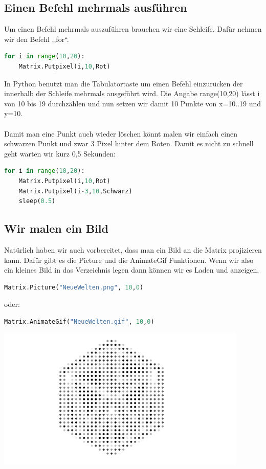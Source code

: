 \subsection{\large{Einen Befehl mehrmals ausführen}}
Um einen Befehl mehrmals auszuführen brauchen wir eine Schleife. Dafür nehmen wir den Befehl ,,for``.
\begin{lstlisting}[language=Python, caption=For Schleifen]
for i in range(10,20):
	Matrix.Putpixel(i,10,Rot)
\end{lstlisting}
In Python benutzt man die Tabulatortaste um einen Befehl einzurücken der innerhalb der Schleife mehrmals ausgeführt wird. Die Angabe range(10,20) lässt i von 10 bis 19 durchzählen und nun setzen wir damit 10 Punkte von x=10..19 und y=10. \\
\ \\
Damit man eine Punkt auch wieder löschen könnt malen wir einfach einen schwarzen Punkt und zwar 3 Pixel hinter dem Roten. Damit es nicht zu schnell geht warten wir kurz 0,5 Sekunden:
\begin{lstlisting}[language=Python, caption=For Schleifen]
for i in range(10,20):
	Matrix.Putpixel(i,10,Rot)
	Matrix.Putpixel(i-3,10,Schwarz)
	sleep(0.5)
\end{lstlisting}

\subsection{\large{Wir malen ein Bild}}
Natürlich haben wir auch vorbereitet, dass man ein Bild an die Matrix projizieren kann. Dafür gibt es die Picture und die AnimateGif Funktionen. Wenn wir also ein kleines Bild in das Verzeichnis legen dann können wir es Laden und anzeigen.
\begin{lstlisting}[language=Python, caption=Ein Bild]
Matrix.Picture("NeueWelten.png", 10,0)
\end{lstlisting}
oder:
\begin{lstlisting}[language=Python, caption=Ein Animiertes Gif]
Matrix.AnimateGif("NeueWelten.gif", 10,0)
\end{lstlisting}
\begin{minipage}[t]{\textwidth}
  \centering
  \includegraphics[width=0.9\textwidth]{pictures/NW.png}
  \label{img:NW}
\end{minipage}


